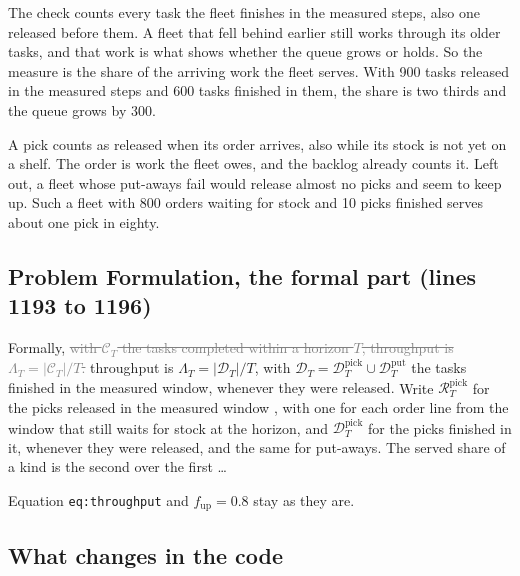 \documentclass[11pt,a4paper]{article}
\newcommand{\new}[1]{\textcolor{newc}{#1}}
\newcommand{\old}[1]{\textcolor{gray}{\sout{#1}}}
\begin{document}
The check counts every task the fleet finishes in the measured steps, also one released before them.
A fleet that fell behind earlier still works through its older tasks, and that work is what shows
whether the queue grows or holds. So the measure is the share of the arriving work the fleet serves.
With 900 tasks released in the measured steps and 600 tasks finished in them, the share is two thirds
and the queue grows by 300.

\new{A pick counts as released when its order arrives, also while its stock is not yet on a shelf.
The order is work the fleet owes, and the backlog already counts it. Left out, a fleet whose
put-aways fail would release almost no picks and seem to keep up. Such a fleet with 800 orders
waiting for stock and 10 picks finished serves about one pick in eighty.}

\subsection*{Problem Formulation, the formal part (lines 1193 to 1196)}

Formally, \old{with $\mathcal{C}_T$ the tasks completed within a horizon $T$, throughput is
$\Lambda_T = |\mathcal{C}_T| / T$.} \new{throughput is $\Lambda_T = |\mathcal{D}_T| / T$, with
$\mathcal{D}_T = \mathcal{D}^{\mathrm{pick}}_T \cup \mathcal{D}^{\mathrm{put}}_T$ the tasks finished in
the measured window, whenever they were released.}
Write $\mathcal{R}^{\mathrm{pick}}_T$ for the picks released in the measured window
\new{, with one for each order line from the window that still waits for stock at the horizon,}
and $\mathcal{D}^{\mathrm{pick}}_T$ for the picks finished in it, whenever they were released, and
the same for put-aways. The served share of a kind is the second over the first \dots

Equation \texttt{eq:throughput} and $f_{\mathrm{up}} = 0.8$ stay as they are.

\subsection*{What changes in the code}
\end{document}
